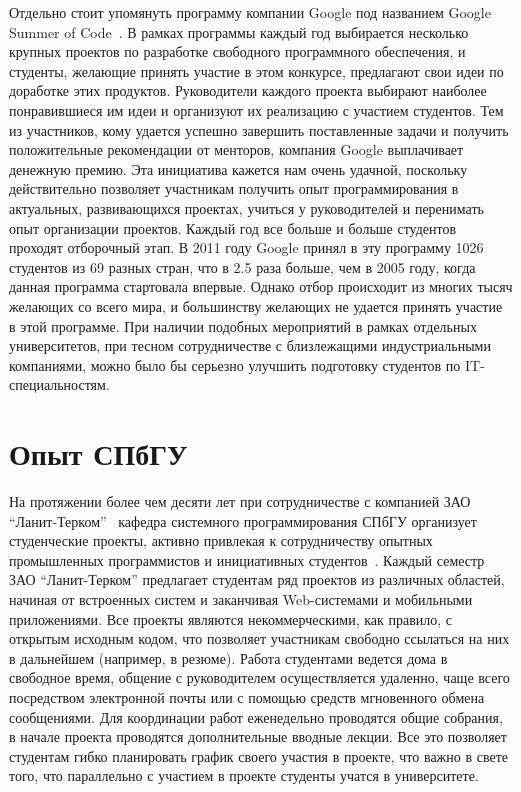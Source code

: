 \documentclass[a4paper]{article}
\begin{document}
Отдельно стоит упомянуть программу компании Google под названием Google Summer of Code~\cite{google}. В рамках программы каждый год выбирается несколько крупных проектов по разработке свободного программного обеспечения, и студенты, желающие принять участие в этом конкурсе, предлагают свои идеи по доработке этих продуктов. Руководители каждого проекта выбирают наиболее понравившиеся им идеи и организуют их реализацию с участием студентов. Тем из участников, кому удается успешно завершить поставленные задачи и получить положительные рекомендации от менторов, компания Google выплачивает денежную премию. Эта инициатива  кажется нам очень удачной, поскольку действительно позволяет участникам получить опыт программирования в актуальных, развивающихся проектах, учиться у руководителей и перенимать опыт организации проектов. Каждый год все больше и больше студентов проходят отборочный этап.  В 2011 году Google принял в эту программу 1026 студентов из 69 разных стран, что в 2.5 раза больше, чем в 2005 году, когда данная программа стартовала впервые. Однако отбор происходит из многих тысяч желающих со всего мира, и большинству желающих не удается принять участие в этой программе. При наличии подобных мероприятий в рамках отдельных университетов, при тесном сотрудничестве с близлежащими индустриальными компаниями, можно было бы серьезно улучшить подготовку студентов по IT-специальностям.

\section{Опыт СПбГУ}

На протяжении более чем десяти лет при сотрудничестве с компанией ЗАО ``Ланит-Терком''~\cite{tercom} кафедра системного программирования СПбГУ организует студенческие проекты, активно привлекая к сотрудничеству опытных промышленных программистов и инициативных студентов~\cite{gagarsky, saratov, terekhov3}. Каждый семестр ЗАО ``Ланит-Терком'' предлагает студентам ряд проектов из различных областей, начиная от встроенных систем и заканчивая Web-системами и мобильными приложениями. Все проекты являются некоммерческими, как правило, с открытым исходным кодом, что позволяет участникам свободно ссылаться на них  в дальнейшем (например, в резюме). Работа студентами ведется дома в свободное время, общение с руководителем осуществляется удаленно, чаще всего посредством электронной почты или с помощью средств мгновенного обмена сообщениями. Для координации работ еженедельно проводятся общие собрания, в начале проекта проводятся дополнительные вводные лекции. Все это позволяет студентам гибко планировать график своего участия в проекте, что важно в свете того, что параллельно с участием в проекте студенты учатся в университете. 
\end{document}

